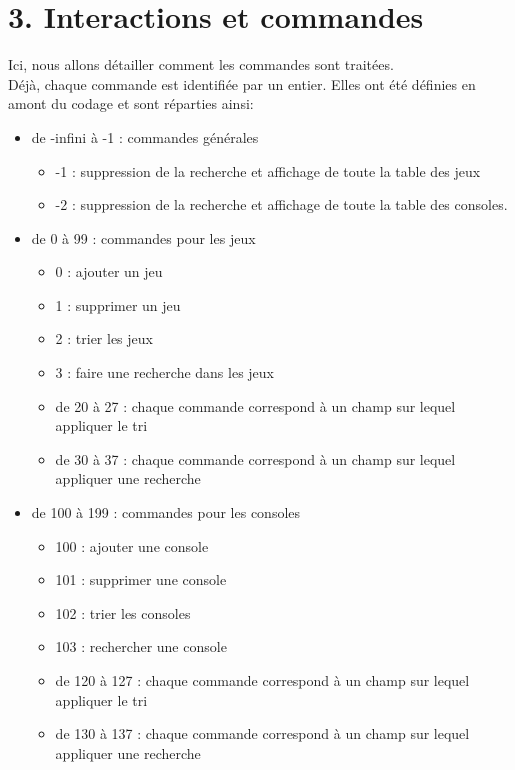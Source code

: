 \documentclass[11pt]{article}
\begin{document}
    \section*{3. Interactions et commandes}
    Ici, nous allons détailler comment les commandes sont traitées.
    \\
    Déjà, chaque commande est identifiée par un entier. Elles ont été définies en amont du codage et sont réparties ainsi:
    \begin{itemize}
        \item de -infini à  -1 : commandes générales
        \begin{itemize}
            \item -1 : suppression de la recherche et affichage de toute la table des jeux
            \item -2 : suppression de la recherche et affichage de toute la table des consoles.
        \end{itemize}
        \item de 0 à 99 : commandes pour les jeux
        \begin{itemize}
            \item 0 : ajouter un jeu
            \item 1 : supprimer un jeu
            \item 2 : trier les jeux
            \item 3 : faire une recherche dans les jeux
            \item de 20 à 27 : chaque commande correspond à un champ sur lequel appliquer le tri
            \item de 30 à 37 : chaque commande correspond à un champ sur lequel appliquer une recherche
        \end{itemize}
        \item de 100 à 199 : commandes pour les consoles
        \begin{itemize}
            \item 100 : ajouter une console
            \item 101 : supprimer une console
            \item 102 : trier les consoles
            \item 103 : rechercher une console
            \item de 120 à 127 : chaque commande correspond à un champ sur lequel appliquer le tri
            \item de 130 à 137 : chaque commande correspond à un champ sur lequel appliquer une recherche
        \end{itemize}
    \end{itemize}
    \vspace{\baselineskip}
    
\end{document}
